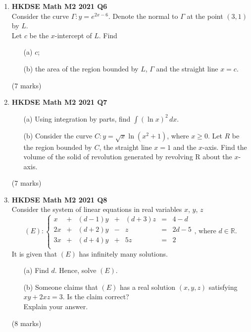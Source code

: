 \documentclass{report}
\begin{document}
\begin{enumerate}
	\item \textbf{HKDSE Math M2 2021 Q6}\\
	Consider the curve $\Gamma : y = e^{2x-6}$. Denote the normal to $\Gamma$ at the point $(3,1)$ by $L$. \\
	Let $c$ be the $x$-intercept of $L$. Find
	\begin{enumerate}
		\item [(a)]$c$;
		\item [(b)]the area of the region bounded by $L$, $\Gamma$ and the straight line $x=c$.
	\end{enumerate}
	(7 marks)

	\newpage

	\item \textbf{HKDSE Math M2 2021 Q7}
	\begin{enumerate}
		\item [(a)]Using integration by parts, find $\displaystyle\int (\ln{x})^2 \,dx$.
		\item [(b)] Consider the curve $\displaystyle C : y = \sqrt{x}\ln{(x^2+1)}$, where $x\geq 0$. Let $R$ be the region bounded by $C$, the straight line $x=1 $ and the $x$-axis. Find the volume of the solid of revolution generated by revolving R about the $x$-axis.
	\end{enumerate}
	(7 marks)

	\item \textbf{HKDSE Math M2 2021 Q8}\\
	Consider the system of linear equations in real variables $x$, $y$, $z$
		$$(E) : \left\{\begin{matrix}
		x&  +&(d-1)y&  +&(d+3)z& = &4-d  \\
		2x&  +&(d+2)y&  -&z& = & 2d-5 \\
		3x&  +&(d+4)y&  +&5z& = & 2 \\
		\end{matrix}\right. \text{,  where } d \in \mathbb{R} .$$
		It is given that $(E)$ has infinitely many solutions.
	\begin{enumerate}
		\item [(a)] Find $d$. Hence, solve $(E)$.
		\item [(b)] Someone claims that $(E)$ has a real solution $(x,y,z)$ satisfying $xy + 2xz = 3$. Is the claim correct? \\
		Explain your answer. 
	\end{enumerate}
	(8 marks)


\end{enumerate}
\end{document}
